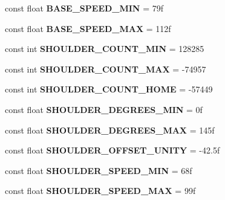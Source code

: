 \begin{DoxyCompactItemize}
const float {\bfseries B\+A\+S\+E\+\_\+\+S\+P\+E\+E\+D\+\_\+\+M\+IN} = 79f
\item 
\mbox{\label{class_scorbot_e_r_i_x_aec1e3db10ee2126d086b1f09418c3a6f}} 
const float {\bfseries B\+A\+S\+E\+\_\+\+S\+P\+E\+E\+D\+\_\+\+M\+AX} = 112f
\item 
\mbox{\label{class_scorbot_e_r_i_x_afb9e614c6e3c1ad3e4a837431da57baa}} 
const int {\bfseries S\+H\+O\+U\+L\+D\+E\+R\+\_\+\+C\+O\+U\+N\+T\+\_\+\+M\+IN} = 128285
\item 
\mbox{\label{class_scorbot_e_r_i_x_a5aea6e74f6106645659af6277b7985d9}} 
const int {\bfseries S\+H\+O\+U\+L\+D\+E\+R\+\_\+\+C\+O\+U\+N\+T\+\_\+\+M\+AX} = -\/74957
\item 
\mbox{\label{class_scorbot_e_r_i_x_a37670e096b48f9a8e208f62e8251a63a}} 
const int {\bfseries S\+H\+O\+U\+L\+D\+E\+R\+\_\+\+C\+O\+U\+N\+T\+\_\+\+H\+O\+ME} = -\/57449
\item 
\mbox{\label{class_scorbot_e_r_i_x_abf5def60bf51e7f5dafb62c7ee4be5b0}} 
const float {\bfseries S\+H\+O\+U\+L\+D\+E\+R\+\_\+\+D\+E\+G\+R\+E\+E\+S\+\_\+\+M\+IN} = 0f
\item 
\mbox{\label{class_scorbot_e_r_i_x_ae2ec88d4bbc6e616043a829d44af60fc}} 
const float {\bfseries S\+H\+O\+U\+L\+D\+E\+R\+\_\+\+D\+E\+G\+R\+E\+E\+S\+\_\+\+M\+AX} = 145f
\item 
\mbox{\label{class_scorbot_e_r_i_x_a66aa4b2a89db3da86451ca65d03cc85e}} 
const float {\bfseries S\+H\+O\+U\+L\+D\+E\+R\+\_\+\+O\+F\+F\+S\+E\+T\+\_\+\+U\+N\+I\+TY} = -\/42.\+5f
\item 
\mbox{\label{class_scorbot_e_r_i_x_a93c70776a83323ff29435e128a4dc9e1}} 
const float {\bfseries S\+H\+O\+U\+L\+D\+E\+R\+\_\+\+S\+P\+E\+E\+D\+\_\+\+M\+IN} = 68f
\item 
\mbox{\label{class_scorbot_e_r_i_x_ac954f63aedcf1340b4d1ecd95d8f5a0c}} 
const float {\bfseries S\+H\+O\+U\+L\+D\+E\+R\+\_\+\+S\+P\+E\+E\+D\+\_\+\+M\+AX} = 99f
\item 

\end{DoxyCompactItemize}
